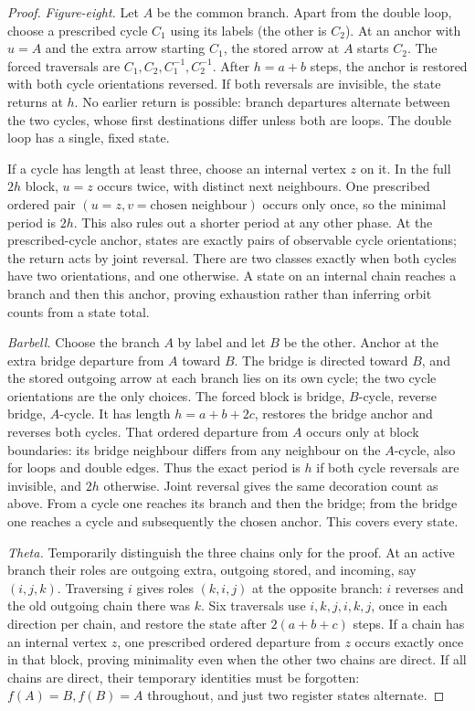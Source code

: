 \begin{proof}
\emph{Figure-eight.}
Let $A$ be the common branch. Apart from the double loop, choose a prescribed
cycle $C_1$ using its labels (the other is $C_2$). At an anchor with $u=A$
and the extra arrow starting $C_1$, the stored arrow at $A$ starts $C_2$.
The forced traversals are $C_1,C_2,C_1^{-1},C_2^{-1}$. After
$h=a+b$ steps, the anchor is restored with both cycle orientations reversed.
If both reversals are invisible, the state returns at $h$. No earlier
return is possible: branch departures alternate between the two cycles,
whose first destinations differ unless both are loops. The double loop
has a single, fixed state.

If a cycle has length at least three, choose an internal vertex $z$ on it.
In the full $2h$ block, $u=z$ occurs twice, with distinct next neighbours.
One prescribed ordered pair $(u=z,v=\text{chosen neighbour})$ occurs only
once, so the minimal period is $2h$. This also rules out a shorter period
at any other phase. At the prescribed-cycle anchor, states are exactly
pairs of observable cycle orientations; the return acts by joint reversal.
There are two classes exactly when both cycles have two orientations,
and one otherwise. A state on an internal chain reaches a branch and
then this anchor, proving exhaustion rather than inferring orbit counts
from a state total.

\emph{Barbell.}
Choose the branch $A$ by label and let $B$ be the other. Anchor at the
extra bridge departure from $A$ toward $B$. The bridge is directed toward
$B$, and the stored outgoing arrow at each branch lies on its own cycle;
the two cycle orientations are the only choices. The forced block is
bridge, $B$-cycle, reverse bridge, $A$-cycle. It has length
$h=a+b+2c$, restores the bridge anchor and reverses both cycles.
That ordered departure from $A$ occurs only at block boundaries: its
bridge neighbour differs from any neighbour on the $A$-cycle, also for
loops and double edges. Thus the exact period is $h$ if both cycle
reversals are invisible, and $2h$ otherwise. Joint reversal gives the
same decoration count as above. From a cycle one reaches its branch
and then the bridge; from the bridge one reaches a cycle and subsequently
the chosen anchor. This covers every state.

\emph{Theta.}
Temporarily distinguish the three chains only for the proof. At an active
branch their roles are outgoing extra, outgoing stored, and incoming,
say $(i,j,k)$. Traversing $i$ gives roles $(k,i,j)$ at the opposite
branch: $i$ reverses and the old outgoing chain there was $k$. Six
traversals use $i,k,j,i,k,j$, once in each direction per chain, and restore
the state after $2(a+b+c)$ steps. If a chain has an internal vertex $z$,
one prescribed ordered departure from $z$ occurs exactly once in that
block, proving minimality even when the other two chains are direct.
If all chains are direct, their temporary identities must be forgotten:
$f(A)=B,f(B)=A$ throughout, and just two register states alternate.


\end{proof}
